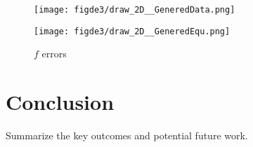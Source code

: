 \documentclass{article}
\begin{document}
\begin{figure}[ht!]
    \centering
    \begin{minipage}{0.45\textwidth}
        \centering
        \texttt{[image: figde3/draw\_2D\_\_GeneredData.png]} %
        \caption{$0.5*sin(x)$}
        \label{fig:fig1}
    \end{minipage}\hfill
    \begin{minipage}{0.45\textwidth}
        \centering
        \texttt{[image: figde3/draw\_2D\_\_GeneredEqu.png]} %
        \caption{$f$ errors}
    \end{minipage}
\end{figure}

\section{Conclusion}
Summarize the key outcomes and potential future work.

\end{document}

